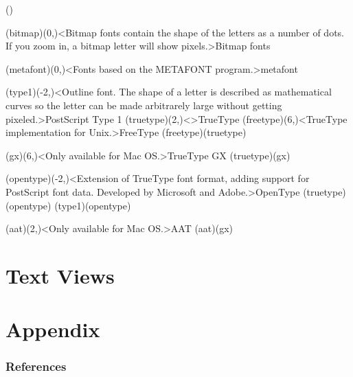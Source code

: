 \documentclass[
%
]{scrartcl}
\begin{document}
\tograph(){
	\tonode(bitmap)(0,\layer)<Bitmap fonts contain the shape of the letters as a number of dots. If you zoom in, a bitmap letter will show pixels.>{Bitmap fonts}
	\steplayer[-3]

	\tonode(metafont)(0,\layer)<Fonts based on the METAFONT program.>{metafont}
	\steplayer[-3]

	\tonode(type1)(-2,\layer)<Outline font. The shape of a letter is described as mathematical curves so the letter can be made arbitrarely large without getting pixeled.>{PostScript Type 1}
	\tonode(truetype)(2,\layer)<>{TrueType}
	\tonode(freetype)(6,\layer)<TrueType implementation for Unix.>{FreeType}
	\todraw(freetype)(truetype)
	\steplayer[-3]

	\tonode(gx)(6,\layer)<Only available for Mac OS.>{TrueType GX}
	\todraw(truetype)(gx)
	\steplayer[-3]

	\tonode(opentype)(-2,\layer)<Extension of TrueType font format, adding support for PostScript font data. Developed by Microsoft and Adobe.>{OpenType}
	\todraw(truetype)(opentype)
	\todraw(type1)(opentype)

	\tonode(aat)(2,\layer)<Only available for Mac OS.>{AAT}
	\todraw(aat)(gx)
}

\clearpage
\restoregeometry
{}
\part{Text Views}  %
\label{sec:text}
\settextviews

\appendix
\part{Appendix}
\section{References}
\label{sec:refs}
\normalsize\obeylines\flushleft  %
\end{document}
